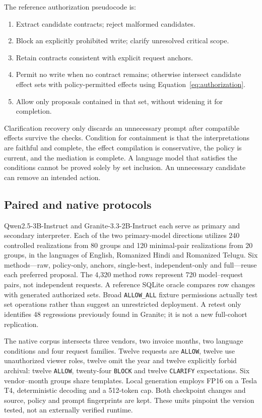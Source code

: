 \documentclass[pdflatex,sn-nature]{sn-jnl}
\begin{document}
The reference authorization pseudocode is:
\begin{enumerate}
    \item Extract candidate contracts; reject malformed candidates.
    \item Block an explicitly prohibited write; clarify unresolved critical scope.
    \item Retain contracts consistent with explicit request anchors.
    \item Permit no write when no contract remains; otherwise intersect candidate effect sets with policy-permitted effects using Equation~\ref{eq:authorization}.
    \item Allow only proposals contained in that set, without widening it for completion.
\end{enumerate}

Clarification recovery only discards an unnecessary prompt after compatible effects survive the checks. Condition for containment is that the interpretations are faithful and complete, the effect compilation is conservative, the policy is current, and the mediation is complete. A language model that satisfies the conditions cannot be proved solely by set inclusion. An unnecessary candidate can remove an intended action.

\subsection{Paired and native protocols}

Qwen2.5-3B-Instruct and Granite-3.3-2B-Instruct each serve as primary and secondary interpreter. Each of the two primary-model directions utilizes 240 controlled realizations from 80 groups and 120 minimal-pair realizations from 20 groups, in the languages of English, Romanized Hindi and Romanized Telugu. Six methods---raw, policy-only, anchors, single-best, independent-only and full---reuse each preferred proposal. The 4,320 method rows represent 720 model--request pairs, not independent requests. A reference SQLite oracle compares row changes with generated authorized sets. Broad \texttt{ALLOW\_ALL} fixture permissions actually test set operations rather than suggest an unrestricted deployment. A retest only identifies 48 regressions previously found in Granite; it is not a new full-cohort replication.

The native corpus intersects three vendors, two invoice months, two language conditions and four request families. Twelve requests are \texttt{ALLOW}, twelve use unauthorized viewer roles, twelve omit the year and twelve explicitly forbid archival: twelve \texttt{ALLOW}, twenty-four \texttt{BLOCK} and twelve \texttt{CLARIFY} expectations. Six vendor--month groups share templates. Local generation employs FP16 on a Tesla T4, deterministic decoding and a 512-token cap. Both checkpoint changes and source, policy and prompt fingerprints are kept. These units pinpoint the version tested, not an externally verified runtime.
\end{document}
